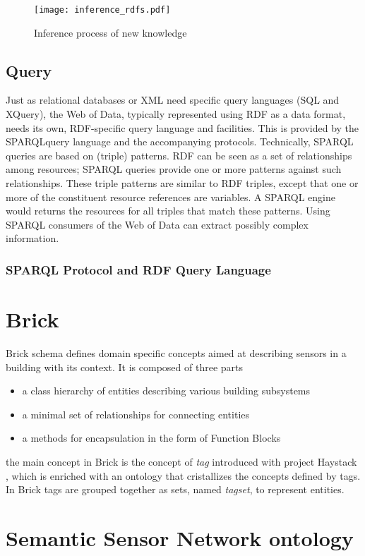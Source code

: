 \begin{figure}
  \centering
  \texttt{[image: inference\_rdfs.pdf]}
  \caption{Inference process of new knowledge}
  \label{fig:inference_rdfs}
\end{figure}



\subsection{Query}
Just as relational databases or XML need specific query languages (SQL and XQuery), the Web of Data, typically represented using RDF as a data format, needs its own, RDF-specific query language and facilities. This is provided by the SPARQLquery language and the accompanying protocols. Technically, SPARQL queries are based on (triple) patterns. RDF can be seen as a set of relationships among resources; SPARQL queries provide one or more patterns against such relationships. These triple patterns are similar to RDF triples, except that one or more of the constituent resource references are variables. A SPARQL engine would returns the resources for all triples that match these patterns. Using SPARQL consumers of the Web of Data can extract possibly complex information.

\subsubsection{SPARQL Protocol and RDF Query Language}

\section{Brick} \label{sec:brick}
Brick schema defines domain specific concepts aimed at describing sensors in a building with its context. It is composed of three parts
\begin{itemize}
  \item a class hierarchy of entities describing various building subsystems
  \item a minimal set of relationships for connecting entities
  \item a methods for encapsulation in the form of Function Blocks
\end{itemize}

the main concept in Brick is the concept of \textit{tag} introduced with project Haystack \cite{project_haystack}, which is enriched with an ontology that cristallizes the concepts defined by tags. In Brick tags are grouped together as sets, named \textit{tagset}, to represent entities.

\section{Semantic Sensor Network ontology} \label{sec:ssn}
